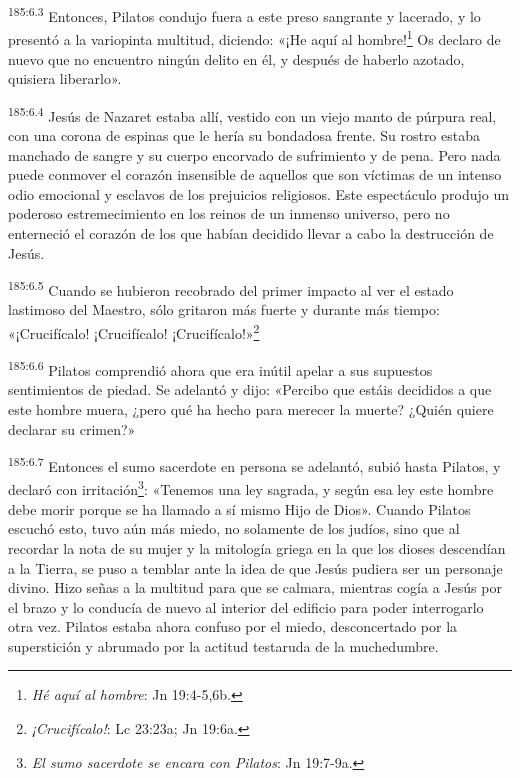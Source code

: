 \par 
\textsuperscript{185:6.3} Entonces, Pilatos condujo fuera a este preso sangrante y lacerado, y lo presentó a la variopinta multitud, diciendo: «¡He aquí al hombre!\footnote{\textit{Hé aquí al hombre}: Jn 19:4-5,6b.} Os declaro de nuevo que no encuentro ningún delito en él, y después de haberlo azotado, quisiera liberarlo».

\par 
\textsuperscript{185:6.4} Jesús de Nazaret estaba allí, vestido con un viejo manto de púrpura real, con una corona de espinas que le hería su bondadosa frente. Su rostro estaba manchado de sangre y su cuerpo encorvado de sufrimiento y de pena. Pero nada puede conmover el corazón insensible de aquellos que son víctimas de un intenso odio emocional y esclavos de los prejuicios religiosos. Este espectáculo produjo un poderoso estremecimiento en los reinos de un inmenso universo, pero no enterneció el corazón de los que habían decidido llevar a cabo la destrucción de Jesús.

\par 
\textsuperscript{185:6.5} Cuando se hubieron recobrado del primer impacto al ver el estado lastimoso del Maestro, sólo gritaron más fuerte y durante más tiempo: «¡Crucifícalo! ¡Crucifícalo! ¡Crucifícalo!»\footnote{\textit{¡Crucifícalo!}: Lc 23:23a; Jn 19:6a.}

\par 
\textsuperscript{185:6.6} Pilatos comprendió ahora que era inútil apelar a sus supuestos sentimientos de piedad. Se adelantó y dijo: «Percibo que estáis decididos a que este hombre muera, ¿pero qué ha hecho para merecer la muerte? ¿Quién quiere declarar su crimen?»

\par 
\textsuperscript{185:6.7} Entonces el sumo sacerdote en persona se adelantó, subió hasta Pilatos, y declaró con irritación\footnote{\textit{El sumo sacerdote se encara con Pilatos}: Jn 19:7-9a.}: «Tenemos una ley sagrada, y según esa ley este hombre debe morir porque se ha llamado a sí mismo Hijo de Dios». Cuando Pilatos escuchó esto, tuvo aún más miedo, no solamente de los judíos, sino que al recordar la nota de su mujer y la mitología griega en la que los dioses descendían a la Tierra, se puso a temblar ante la idea de que Jesús pudiera ser un personaje divino. Hizo señas a la multitud para que se calmara, mientras cogía a Jesús por el brazo y lo conducía de nuevo al interior del edificio para poder interrogarlo otra vez. Pilatos estaba ahora confuso por el miedo, desconcertado por la superstición y abrumado por la actitud testaruda de la muchedumbre.

